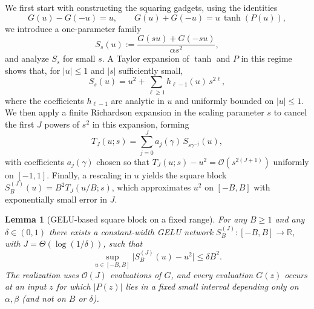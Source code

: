 \documentclass{article}
\theoremstyle{plain}
\newtheorem{lemma}[theorem]{Lemma}
\theoremstyle{definition}
\theoremstyle{remark}
\begin{document}
We first start with constructing the squaring gadgets, using the identities
\[
G(u)-G(-u)=u,
\qquad
G(u)+G(-u)=u\,\tanh(P(u)),
\]
we introduce a one-parameter family
\[
S_s(u):=\frac{G(su)+G(-su)}{\alpha s^2},
\]
and analyze $S_s$ for small $s$. A Taylor expansion of $\tanh$ and $P$ in this regime shows that, for $|u|\le 1$ and $|s|$ sufficiently small,
\[
S_s(u)=u^2+\sum_{\ell\ge 1} h_{\ell-1}(u)\,s^{2\ell},
\]
where the coefficients $h_{\ell-1}$ are analytic in $u$ and uniformly bounded on $|u|\le 1$. We then apply a finite Richardson expansion in the scaling parameter $s$ to cancel the first $J$ powers of $s^2$ in this expansion, forming
\[
T_J(u;s)=\sum_{j=0}^J a_j(\gamma)\,S_{s\gamma^{-j}}(u),
\]
with coefficients $a_j(\gamma)$ chosen so that $T_J(u;s)-u^2=\mathcal{O}(s^{2(J+1)})$ uniformly on $[-1,1]$. Finally, a rescaling in $u$ yields the square block $S_B^{(J)}(u)=B^2 T_J(u/B;s)$, which approximates $u^2$ on $[-B,B]$ with exponentially small error in $J$.

\begin{lemma}[GELU-based square block on a fixed range]
\label{lem:gelu-square}
For any $B\ge 1$ and any $\delta\in(0,1)$ there exists a constant-width GELU network $S_B^{(J)}:[-B,B]\to\mathbb{R}$, with $J=\Theta(\log(1/\delta))$, such that
\[
\sup_{u\in[-B,B]}\bigl|S_B^{(J)}(u)-u^2\bigr|\le \delta B^2.
\]
The realization uses $\mathcal{O}(J)$ evaluations of $G$, and every evaluation $G(z)$ occurs at an input $z$ for which $|P(z)|$ lies in a fixed small interval depending only on $\alpha,\beta$ (and not on $B$ or $\delta$).
\end{lemma}
\end{document}
